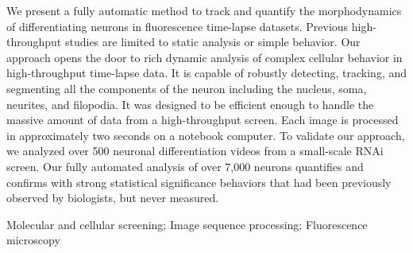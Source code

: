 
We present a fully automatic method  to track and quantify the morphodynamics of
differentiating neurons  in fluorescence  time-lapse datasets.  Previous high-throughput studies are
limited to static analysis or simple behavior. Our approach opens the door to rich 
dynamic analysis of complex cellular behavior in high-throughput time-lapse data.
It is capable of  robustly detecting, tracking,  and segmenting all the  components of
the neuron including the nucleus, soma, neurites, and filopodia.  
It was designed to be efficient enough to handle the massive amount of
data from a high-throughput screen. Each image is processed in approximately two 
seconds on a notebook computer. To validate  our approach,  we
analyzed over 500 neuronal differentiation videos from a small-scale RNAi screen. Our
fully automated analysis of over 7,000 neurons quantifies  and  confirms with strong
statistical significance behaviors that  had  been previously observed by 
biologists, but never measured. 




\begin{keywords}
Molecular and cellular screening; Image sequence processing; Fluorescence microscopy
\end{keywords}

